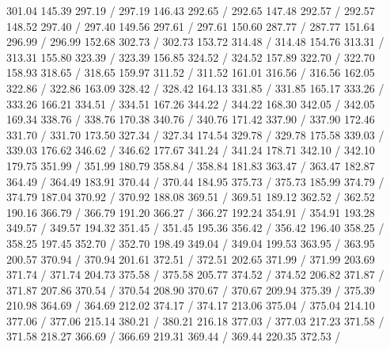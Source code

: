{ 301.04 145.39 297.19 /
 297.19 146.43 292.65 /
 292.65 147.48 292.57 /
 292.57 148.52 297.40 /
 297.40 149.56 297.61 /
 297.61 150.60 287.77 /
 287.77 151.64 296.99 /
 296.99 152.68 302.73 /
 302.73 153.72 314.48 /
 314.48 154.76 313.31 /
 313.31 155.80 323.39 /
 323.39 156.85 324.52 /
 324.52 157.89 322.70 /
 322.70 158.93 318.65 /
 318.65 159.97 311.52 /
 311.52 161.01 316.56 /
 316.56 162.05 322.86 /
 322.86 163.09 328.42 /
 328.42 164.13 331.85 /
 331.85 165.17 333.26 /
 333.26 166.21 334.51 /
 334.51 167.26 344.22 /
 344.22 168.30 342.05 /
 342.05 169.34 338.76 /
 338.76 170.38 340.76 /
 340.76 171.42 337.90 /
 337.90 172.46 331.70 /
 331.70 173.50 327.34 /
 327.34 174.54 329.78 /
 329.78 175.58 339.03 /
 339.03 176.62 346.62 /
 346.62 177.67 341.24 /
 341.24 178.71 342.10 /
 342.10 179.75 351.99 /
 351.99 180.79 358.84 /
 358.84 181.83 363.47 /
 363.47 182.87 364.49 /
 364.49 183.91 370.44 /
 370.44 184.95 375.73 /
 375.73 185.99 374.79 /
 374.79 187.04 370.92 /
 370.92 188.08 369.51 /
 369.51 189.12 362.52 /
 362.52 190.16 366.79 /
 366.79 191.20 366.27 /
 366.27 192.24 354.91 /
 354.91 193.28 349.57 /
 349.57 194.32 351.45 /
 351.45 195.36 356.42 /
 356.42 196.40 358.25 /
 358.25 197.45 352.70 /
 352.70 198.49 349.04 /
 349.04 199.53 363.95 /
 363.95 200.57 370.94 /
 370.94 201.61 372.51 /
 372.51 202.65 371.99 /
 371.99 203.69 371.74 /
 371.74 204.73 375.58 /
 375.58 205.77 374.52 /
 374.52 206.82 371.87 /
 371.87 207.86 370.54 /
 370.54 208.90 370.67 /
 370.67 209.94 375.39 /
 375.39 210.98 364.69 /
 364.69 212.02 374.17 /
 374.17 213.06 375.04 /
 375.04 214.10 377.06 /
 377.06 215.14 380.21 /
 380.21 216.18 377.03 /
 377.03 217.23 371.58 /
 371.58 218.27 366.69 /
 366.69 219.31 369.44 /
 369.44 220.35 372.53 /
}
